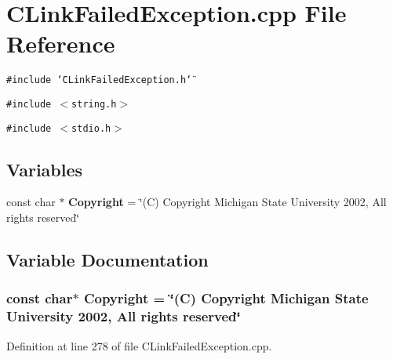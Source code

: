 \section{CLink\-Failed\-Exception.cpp File Reference}
\label{CLinkFailedException_8cpp}
{\tt \#include \char`\"{}CLink\-Failed\-Exception.h\char`\"{}}\par
{\tt \#include $<$string.h$>$}\par
{\tt \#include $<$stdio.h$>$}\par
\subsection*{Variables}
\begin{CompactItemize}
\item 
const char $\ast$ {\bf Copyright} = \char`\"{}(C) Copyright Michigan State University 2002, All rights reserved\char`\"{}
\end{CompactItemize}


\subsection{Variable Documentation}
\subsubsection{\setlength{\rightskip}{0pt plus 5cm}const char$\ast$ Copyright = \char`\"{}(C) Copyright Michigan State University 2002, All rights reserved\char`\"{}\hspace{0.3cm}{\tt  [static]}}\label{CLinkFailedException_8cpp_a0}




Definition at line 278 of file CLink\-Failed\-Exception.cpp.